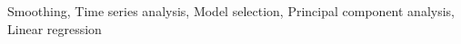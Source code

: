\documentclass[]{article}
\begin{document}
Smoothing, Time series analysis, Model selection, Principal component analysis, Linear regression
\end{document}
